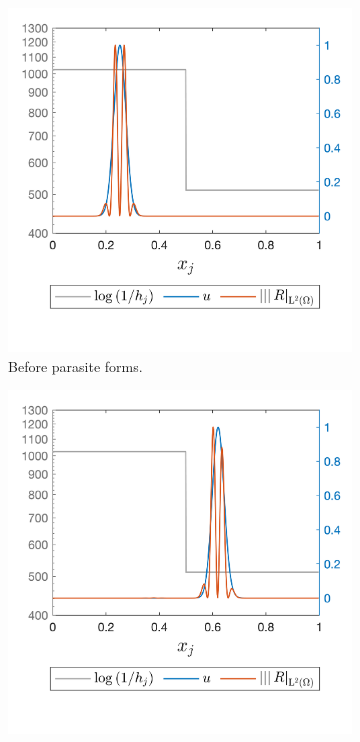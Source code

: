 \documentclass[final]{amsart}
\numberwithin{equation}{section}
\begin{document}
\begin{figure}[H]
	\centering
	\begin{subfigure}[b]{.3\textwidth}
		\includegraphics[width=\textwidth]{../figures/fig_CNCS_parasite_rep_20_zoom_off}	
		\caption{
			\label{fig:CNCS_parasite_1D_1}
			Before parasite forms.
		}
	\end{subfigure}
	\begin{subfigure}[b]{.3\textwidth}
		\includegraphics[width=\textwidth]{../figures/fig_CNCS_parasite_rep_3800zoom_off}	

\end{subfigure}
\end{figure}
\end{document}
